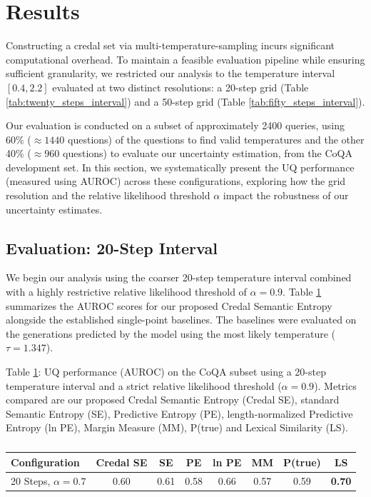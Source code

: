 \section{Results}
\label{sec:experiments:results}
Constructing a credal set via 
multi-temperature-sampling incurs significant computational overhead.
To maintain a feasible evaluation pipeline while ensuring sufficient
granularity, we restricted our analysis to the temperature interval
$[0.4, 2.2]$ evaluated at two distinct resolutions:  
a 20-step grid (Table \ref{tab:twenty_steps_interval}) and a 
50-step grid (Table \ref{tab:fifty_steps_interval}).

Our evaluation is conducted on a subset of approximately 2400 queries, using
60\% ($\approx 1440$ questions) of the questions to find valid
temperatures and the other 40\% ($\approx 960$ questions) to evaluate our 
uncertainty estimation, from the CoQA development set.
In this section, we systematically present the
UQ performance (measured using AUROC) across
these configurations, exploring how the grid resolution and the relative
likelihood threshold $\alpha$ impact the robustness of our uncertainty
estimates.


\subsection{Evaluation: 20-Step Interval}
\label{sec:experiments:results:twenty_steps_interval}
We begin our analysis using the coarser 20-step temperature interval 
combined with a highly restrictive relative likelihood threshold of 
$\alpha=0.9$. Table \ref{tab:results_20_steps_alpha07} summarizes
the AUROC scores for our proposed Credal Semantic Entropy alongside 
the established single-point baselines. The baselines were evaluated on
the generations predicted by the model using the most likely temperature 
($\tau = 1.347$).

Table \ref{tab:results_20_steps_alpha07}: 
	UQ performance (AUROC) on the CoQA subset
	using a 20-step temperature interval and a strict relative
	likelihood threshold ($\alpha=0.9$). Metrics compared are our
	proposed Credal Semantic Entropy (Credal SE), standard Semantic
	Entropy (SE), Predictive Entropy (PE), length-normalized Predictive
	Entropy (ln PE), Margin Measure (MM), P(true) and
	Lexical Similarity (LS).
\begin{table}[h]
    \centering
    \begin{tabular}{lccccccc}
        \toprule
	\textbf{Configuration} & \textbf{Credal SE} & \textbf{SE} & \textbf{PE} & \textbf{ln PE} & \textbf{MM} & \textbf{P(true)} &\textbf{LS}\\
        \midrule
    20 Steps, $\alpha = 0.7$ & 0.60 & 0.61 & 0.58 & 0.66 & 0.57 & 0.59 		&\textbf{0.70}\\
        \bottomrule
    \end{tabular}
    \caption{}
    \label{tab:results_20_steps_alpha07}
\end{table}

